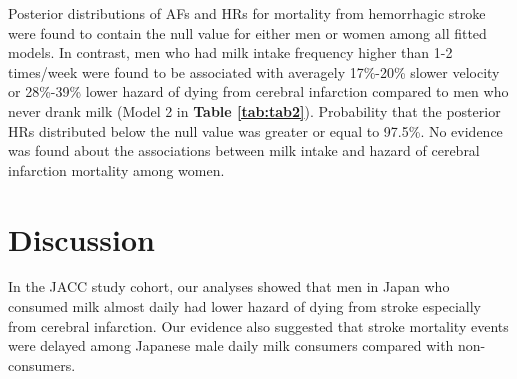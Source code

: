 \documentclass[nutrients,article,submitted,moreauthors,pdftex]{Definitions/mdpi}
\providecommand{\DIFdelbegin}{} %
\newcommand{\DIFscaledelfig}{0.5}
\newlength{\DIFdelgraphicswidth} %
\newlength{\DIFdelgraphicsheight} %
\newcommand{\DIFdelincludegraphics}[2][]{%
\sbox{\DIFdelgraphicsbox}{\DIFOincludegraphics[#1]{#2}}%
\settoboxwidth{\DIFdelgraphicswidth}{\DIFdelgraphicsbox} %
\settoboxtotalheight{\DIFdelgraphicsheight}{\DIFdelgraphicsbox} %
\scalebox{\DIFscaledelfig}{%
\parbox[b]{\DIFdelgraphicswidth}{\usebox{\DIFdelgraphicsbox}\\[-\baselineskip] \rule{\DIFdelgraphicswidth}{0em}}\llap{\resizebox{\DIFdelgraphicswidth}{\DIFdelgraphicsheight}{%
\setlength{\unitlength}{\DIFdelgraphicswidth}%
\begin{picture}(1,1)%
\thicklines\linethickness{2pt} %
{\color[rgb]{1,0,0}\put(0,0){\framebox(1,1){}}}%
{\color[rgb]{1,0,0}\put(0,0){\line( 1,1){1}}}%
{\color[rgb]{1,0,0}\put(0,1){\line(1,-1){1}}}%
\end{picture}%
}\hspace*{3pt}}} %
} %
\DeclareRobustCommand{\DIFdelbegin}{\DIFOdelbegin \let\includegraphics\DIFdelincludegraphics} %
\begin{document}
Posterior distributions of AFs and HRs for mortality from hemorrhagic
stroke were found to contain the null value for either men or women
among all fitted models. In contrast, men who had milk intake frequency
higher than 1-2 times/week were found to be associated with averagely
17\%-20\% slower velocity or 28\%-39\% lower hazard of dying from
cerebral infarction compared to men who never drank milk (Model 2 in
\textbf{Table \ref{tab:tab2}}). Probability that the posterior HRs
distributed below the null value was greater or equal to 97.5\%. No
evidence was found about the associations between milk intake and hazard
of cerebral infarction mortality among women.

\hypertarget{discussion}{%
\section{Discussion}\label{discussion}}

In the JACC study cohort, our analyses showed that men in Japan who
consumed milk almost daily had lower hazard of dying from stroke
especially from cerebral infarction. Our evidence also suggested that
stroke mortality events were delayed among Japanese male daily milk
consumers compared with non-consumers.

\DIFdelbegin %
\end{document}
